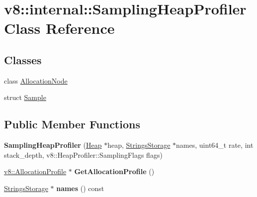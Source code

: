 \hypertarget{classv8_1_1internal_1_1_sampling_heap_profiler}{}\section{v8\+:\+:internal\+:\+:Sampling\+Heap\+Profiler Class Reference}
\label{classv8_1_1internal_1_1_sampling_heap_profiler}
\subsection*{Classes}
\begin{DoxyCompactItemize}
\item 
class \hyperlink{classv8_1_1internal_1_1_sampling_heap_profiler_1_1_allocation_node}{Allocation\+Node}
\item 
struct \hyperlink{structv8_1_1internal_1_1_sampling_heap_profiler_1_1_sample}{Sample}
\end{DoxyCompactItemize}
\subsection*{Public Member Functions}
\begin{DoxyCompactItemize}
\item 
{\bfseries Sampling\+Heap\+Profiler} (\hyperlink{classv8_1_1internal_1_1_heap}{Heap} $\ast$heap, \hyperlink{classv8_1_1internal_1_1_strings_storage}{Strings\+Storage} $\ast$names, uint64\+\_\+t rate, int stack\+\_\+depth, v8\+::\+Heap\+Profiler\+::\+Sampling\+Flags flags)\hypertarget{classv8_1_1internal_1_1_sampling_heap_profiler_a9e2ced230d5ba8793f768022acda90d9}{}\label{classv8_1_1internal_1_1_sampling_heap_profiler_a9e2ced230d5ba8793f768022acda90d9}

\item 
\hyperlink{classv8_1_1_allocation_profile}{v8\+::\+Allocation\+Profile} $\ast$ {\bfseries Get\+Allocation\+Profile} ()\hypertarget{classv8_1_1internal_1_1_sampling_heap_profiler_a6eb106cbd50f0f07fed2ca0e35692cd8}{}\label{classv8_1_1internal_1_1_sampling_heap_profiler_a6eb106cbd50f0f07fed2ca0e35692cd8}

\item 
\hyperlink{classv8_1_1internal_1_1_strings_storage}{Strings\+Storage} $\ast$ {\bfseries names} () const \hypertarget{classv8_1_1internal_1_1_sampling_heap_profiler_acb5d0e32f1a1762b07ff730b4afb89e6}{}\label{classv8_1_1internal_1_1_sampling_heap_profiler_acb5d0e32f1a1762b07ff730b4afb89e6}

\end{DoxyCompactItemize}
